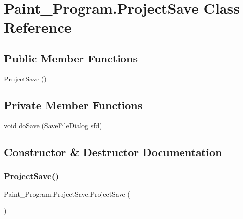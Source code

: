 \hypertarget{class_paint___program_1_1_project_save}{}\section{Paint\+\_\+\+Program.\+Project\+Save Class Reference}
\label{class_paint___program_1_1_project_save}
\subsection*{Public Member Functions}
\begin{DoxyCompactItemize}
\item 
\mbox{\hyperlink{class_paint___program_1_1_project_save_aa96a77459d2ebc0f5b7ae6b5eb21bbe5}{Project\+Save}} ()
\end{DoxyCompactItemize}
\subsection*{Private Member Functions}
\begin{DoxyCompactItemize}
\item 
void \mbox{\hyperlink{class_paint___program_1_1_project_save_aa28784aaca38fc6348c62daf33b31898}{do\+Save}} (Save\+File\+Dialog sfd)
\end{DoxyCompactItemize}


\subsection{Constructor \& Destructor Documentation}
\mbox{\label{class_paint___program_1_1_project_save_aa96a77459d2ebc0f5b7ae6b5eb21bbe5}} 
\subsubsection{\texorpdfstring{Project\+Save()}{ProjectSave()}}
{\footnotesize\ttfamily Paint\+\_\+\+Program.\+Project\+Save.\+Project\+Save (\begin{DoxyParamCaption}{ }\end{DoxyParamCaption})\hspace{0.3cm}{\ttfamily [inline]}}



